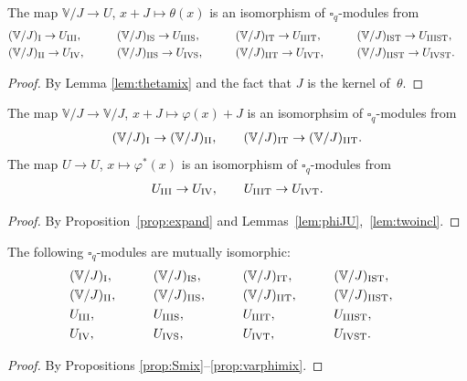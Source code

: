 \begin{Proposition}\label{prop:thetamix}The map $\mathbb V/J\to U$, $x+J\mapsto \theta(x)$ is an isomorphism of $\square_q$-modules from
\begin{alignat*}{5}
&(\mathbb V/J)_{\rm I} \rightarrow U_{\rm III}, \qquad &&
(\mathbb V/J)_{\rm IS} \rightarrow U_{\rm IIIS}, \qquad &&
(\mathbb V/J)_{\rm IT} \rightarrow U_{\rm IIIT}, \qquad &&
(\mathbb V/J)_{\rm IST} \rightarrow U_{\rm IIIST},&\\
&(\mathbb V/J)_{\rm II} \rightarrow U_{\rm IV}, \qquad &&
(\mathbb V/J)_{\rm IIS} \rightarrow U_{\rm IVS}, \qquad &&
(\mathbb V/J)_{\rm IIT} \rightarrow U_{\rm IVT}, \qquad &&
(\mathbb V/J)_{\rm IIST} \rightarrow U_{\rm IVST}.&
\end{alignat*}
\end{Proposition}
\begin{proof}By Lemma \ref{lem:thetamix} and the fact that $J$ is the kernel of~$\theta$.
\end{proof}

\begin{Proposition}\label{prop:varphimix}The map $\mathbb V/J\to \mathbb V/J$, $x+J\mapsto \varphi(x)+J$ is an isomorphsim of $\square_q$-modules from
\begin{gather*}
 (\mathbb V/J)_{\rm I} \rightarrow (\mathbb V/J)_{\rm II}, \qquad (\mathbb V/J)_{\rm IT} \rightarrow (\mathbb V/J)_{\rm IIT}.
\end{gather*}
The map $U\to U$, $x\mapsto \varphi^*(x)$
is an isomorphism of $\square_q$-modules from
\begin{gather*}
 U_{\rm III} \rightarrow U_{\rm IV}, \qquad U_{\rm IIIT} \rightarrow U_{\rm IVT}.
\end{gather*}
\end{Proposition}
\begin{proof} By Proposition~\ref{prop:expand} and Lemmas~\ref{lem:phiJU},~\ref{lem:twoincl}.
\end{proof}

\begin{Theorem}\label{thm:alliso}The following $\square_q$-modules are mutually isomorphic:
\begin{alignat*}{5}
& (\mathbb V/J)_{\rm I}, \qquad&&
(\mathbb V/J)_{\rm IS}, \qquad&&
(\mathbb V/J)_{\rm IT}, \qquad&&
(\mathbb V/J)_{\rm IST},&\\
& (\mathbb V/J)_{\rm II}, \qquad&&
(\mathbb V/J)_{\rm IIS}, \qquad&&
(\mathbb V/J)_{\rm IIT}, \qquad&&
(\mathbb V/J)_{\rm IIST},&\\
&U_{\rm III}, \qquad &&
U_{\rm IIIS}, \qquad &&
U_{\rm IIIT}, \qquad &&
U_{\rm IIIST},&\\
&U_{\rm IV}, \qquad &&
U_{\rm IVS}, \qquad&&
U_{\rm IVT}, \qquad &&
U_{\rm IVST}.&
\end{alignat*}
\end{Theorem}
\begin{proof} By Propositions \ref{prop:Smix}--\ref{prop:varphimix}.
\end{proof}

